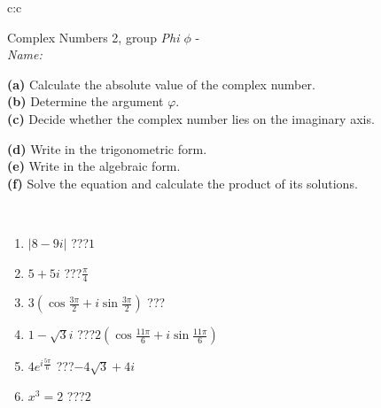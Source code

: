\documentclass[10pt]{report}
\begin{document}
\newpage
\thispagestyle{empty}
\begin{tabular}{c:c}
\begin{minipage}[c][104.5mm][t]{0.5\linewidth}
\begin{center}
\vspace{5mm}
{\huge Complex Numbers 2, group \textit{Phi $\phi$} -}\\[5mm]
\textit{Name:}\phantom{xxxxxxxxxxxxxxxxxxxxxxxxxxxxxxxxxxxxxxxxxxxxxxxxxxxxxxxxxxxxxxxxx}\\[5mm]
\begin{minipage}{0.95\linewidth}
\begin{center}
{\small \begin{minipage}{0.44\textwidth} \raggedright
\textbf{(a)} Calculate the absolute value of the complex number. \\[1mm]
\textbf{(b)} Determine the argument \(\varphi\). \\[1mm]
\textbf{(c)} Decide whether the complex number lies on the imaginary axis. \end{minipage} \begin{minipage}{0.54\textwidth}
\textbf{(d)} Write in the trigonometric form. \\[1mm]
\textbf{(e)} Write in the algebraic form. \\[1mm]
\textbf{(f)} Solve the equation and calculate the product of its solutions.
\end{minipage}
}
\end{center}
\end{minipage}
\\[1mm]
\begin{minipage}{0.79\linewidth}
\begin{center}
\begin{varwidth}{\linewidth}
\setlength{\itemsep}{0pt}
\begin{enumerate}
\large
\item $|8-9i|$\quad \dotfill\; ???\;\dotfill \quad $1$
\item $5+5i$\quad \dotfill\; ???\;\dotfill \quad $\frac{\pi}{4}$
\item $3\left(\cos{\frac{3\pi}{2}}+i\sin{\frac{3\pi}{2}}\right)$\quad \dotfill\; ???\;\dotfill \quad {}
\item $1-\sqrt{3}i$\quad \dotfill\; ???\;\dotfill \quad $2\left(\cos{\frac{11\pi}{6}}+i\sin{\frac{11\pi}{6}}\right)$
\item $4e^{i\frac{5\pi}{6}}$\quad \dotfill\; ???\;\dotfill \quad $-4\sqrt{3}+4i$
\item $x^3=2$\quad \dotfill\; ???\;\dotfill \quad $2$

\end{enumerate}
\end{varwidth}
\end{center}
\end{minipage}
\end{center}
\end{minipage}
\end{tabular}
\end{document}
